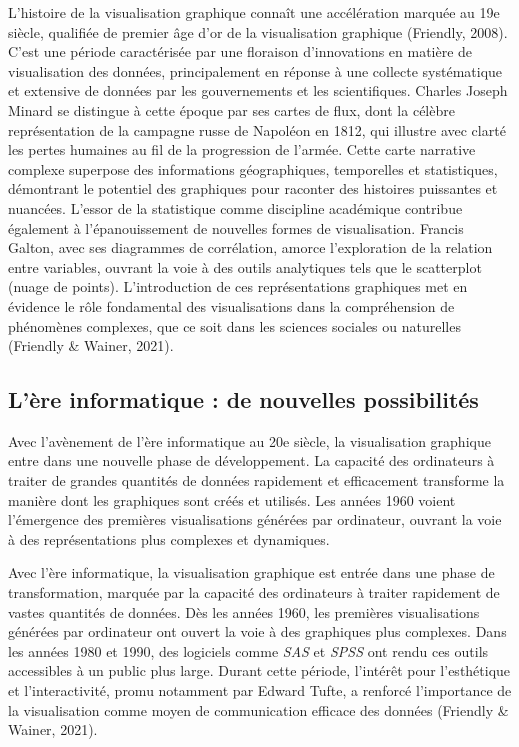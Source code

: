 \documentclass[
  letterpaper,
  DIV=11,
  numbers=noendperiod]{scrreprt}
\begin{document}
L'histoire de la visualisation graphique connaît une accélération
marquée au 19e siècle, qualifiée de premier âge d'or de la visualisation
graphique (Friendly, 2008). C'est une période caractérisée par une
floraison d'innovations en matière de visualisation des données,
principalement en réponse à une collecte systématique et extensive de
données par les gouvernements et les scientifiques. Charles Joseph
Minard se distingue à cette époque par ses cartes de flux, dont la
célèbre représentation de la campagne russe de Napoléon en 1812, qui
illustre avec clarté les pertes humaines au fil de la progression de
l'armée. Cette carte narrative complexe superpose des informations
géographiques, temporelles et statistiques, démontrant le potentiel des
graphiques pour raconter des histoires puissantes et nuancées. L'essor
de la statistique comme discipline académique contribue également à
l'épanouissement de nouvelles formes de visualisation. Francis Galton,
avec ses diagrammes de corrélation, amorce l'exploration de la relation
entre variables, ouvrant la voie à des outils analytiques tels que le
scatterplot (nuage de points). L'introduction de ces représentations
graphiques met en évidence le rôle fondamental des visualisations dans
la compréhension de phénomènes complexes, que ce soit dans les sciences
sociales ou naturelles (Friendly \& Wainer, 2021).

\hypertarget{luxe8re-informatique-de-nouvelles-possibilituxe9s}{%
\subsection{L'ère informatique : de nouvelles
possibilités}\label{luxe8re-informatique-de-nouvelles-possibilituxe9s}}

Avec l'avènement de l'ère informatique au 20e siècle, la visualisation
graphique entre dans une nouvelle phase de développement. La capacité
des ordinateurs à traiter de grandes quantités de données rapidement et
efficacement transforme la manière dont les graphiques sont créés et
utilisés. Les années 1960 voient l'émergence des premières
visualisations générées par ordinateur, ouvrant la voie à des
représentations plus complexes et dynamiques.

Avec l'ère informatique, la visualisation graphique est entrée dans une
phase de transformation, marquée par la capacité des ordinateurs à
traiter rapidement de vastes quantités de données. Dès les années 1960,
les premières visualisations générées par ordinateur ont ouvert la voie
à des graphiques plus complexes. Dans les années 1980 et 1990, des
logiciels comme \emph{SAS} et \emph{SPSS} ont rendu ces outils
accessibles à un public plus large. Durant cette période, l'intérêt pour
l'esthétique et l'interactivité, promu notamment par Edward Tufte, a
renforcé l'importance de la visualisation comme moyen de communication
efficace des données (Friendly \& Wainer, 2021).
\end{document}
